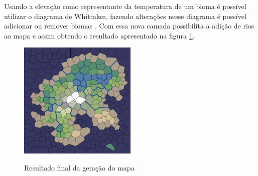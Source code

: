 Usando a elevação como representante da temperatura de um bioma é possível utilizar o diagrama de Whittaker, fazendo alterações nesse diagrama é possível adicionar ou remover biomas \cite{amitp2010}. Com essa nova camada possibilita a adição de rios ao mapa e assim obtendo o resultado apresentado na figura \ref{fig:biomes}.

\begin{figure}[H]
	\caption{Resultado final da geração do mapa}
	\centering
	\includegraphics[width=0.5\textwidth]{figures/biomes.png}
	\label{fig:biomes}
\end{figure}


